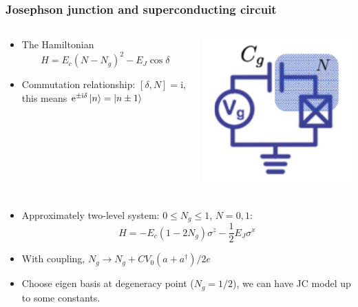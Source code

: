 \documentclass[xcolor=dvipsnames,hyperref={CJKbookmarks=true}]{beamer}
\newcommand\mi{\mathrm{i}}
\newcommand\e{\mathrm{e}}
\begin{document}
\begin{frame}[t]\frametitle{Josephson junction and superconducting circuit}
\begin{columns}
	\begin{column}{0.75\linewidth}
	\begin{itemize}
		\item The Hamiltonian
		$$
			H = E_c (N-N_g)^2 - E_J\cos\delta
		$$
		\item Commutation relationship: $[\delta, N] = \mi$, this means 
		$\e^{\pm\mi\delta}\ket{n} = \ket{n\pm 1}$
	\end{itemize}
	\end{column}%
	\begin{column}{0.25\linewidth}
	\includegraphics[width=\linewidth]{copper_pair_box.pdf}
	\end{column}
\end{columns}
\begin{itemize}
	\item Approximately two-level system: $0\le N_g \le 1$, $N = 0, 1$: 
	$$
	H = -E_c(1-2N_g) \sigma^z - \frac 12 E_J\sigma^x
	$$
	\item With coupling, $N_g \longrightarrow N_g + CV_0 (a + a^\dag)/2e$
	\item Choose eigen basis at degeneracy point ($N_g = 1/2$), we can have JC 
	model up to some constants. 
\end{itemize}
\end{frame}
\end{document}
